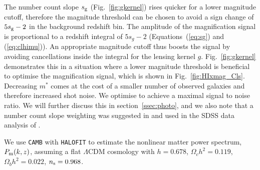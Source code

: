 \documentclass[useAMS,usenatbib]{mnras}
\begin{document}
The number count slope $s_{\rm g}$ (Fig.~\ref{fig:gkernel}) rises quicker for a lower magnitude cutoff, therefore the magnitude threshold can be chosen to avoid a sign change of $5s_{\rm g} -2$ in the background redshift bin. The amplitude of the magnification signal is proportional to a redshift integral of $5s_g-2$ (Equations~(\ref{eq:sg}) and (\ref{eq:clhimu})). An appropriate magnitude cutoff thus boosts the signal by avoiding cancellations inside the integral for the lensing kernel $g$.  Fig.~\ref{fig:gkernel} demonstrates this in a situation where a lower magnitude threshold is beneficial to optimise the magnification signal, which is shown in Fig.~\ref{fig:HIxmag_Cls}. Decreasing $m^*$ comes at the cost of a smaller number of observed galaxies and therefore increased shot noise. We optimise to achieve a maximal signal to noise ratio. We will further discuss this in section~\ref{ssec:photo}, and we also note that a number count slope weighting was suggested in \citep{Menard:2002vz} and used in the SDSS data analysis of \citet{2005ApJ...633..589S}.

 We use \texttt{CAMB} with \texttt{HALOFIT} \citep{2000ApJ...538..473L,Smith:2002dz,Takahashi:2012em} to estimate the nonlinear matter power spectrum, $P_{\rm m}(k,z)$, assuming a flat $\Lambda$CDM cosmology with $h=0.678$, $\Omega_ch^2=0.119$, $\Omega_bh^2=0.022$, $n_{\rm s}=0.968$.
\end{document}
